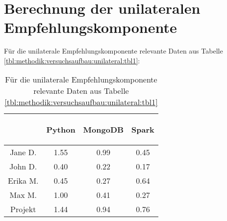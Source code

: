 \section{Berechnung der unilateralen Empfehlungskomponente}
\label{ch:nebenrechnungen:unilateral}
Für die unilaterale Empfehlungskomponente relevante Daten aus Tabelle \ref{tbl:methodik:versuchsaufbau:unilateral:tbl1}:

\begin{table}[h]
	\centering
	\begin{tabular}{c|c|c|c}
		& \begin{sideways}Python\end{sideways} & \begin{sideways}MongoDB\end{sideways} & \begin{sideways}Spark\end{sideways} \\
		\hline
		Jane D.  & 1.55 & 0.99 & 0.45\\
		John D.  & 0.40 & 0.22 & 0.17\\
		Erika M. & 0.45 & 0.27 & 0.64\\
		Max M.   & 1.00 & 0.41 & 0.27\\
		Projekt  & 1.44 & 0.94 & 0.76\\
	\end{tabular}
	\caption{Für die unilaterale Empfehlungskomponente relevante Daten aus Tabelle \ref{tbl:methodik:versuchsaufbau:unilateral:tbl1}}
	\label{tbl:nebenrechnungen:unilateral:tbl1}
\end{table}